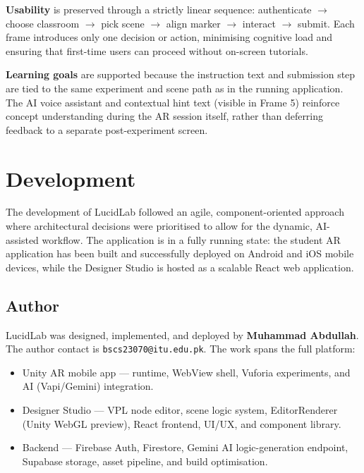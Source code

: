 \documentclass[12pt,a4paper]{article}
\begin{document}
\textbf{Usability} is preserved through a strictly linear sequence: authenticate
$\to$ choose classroom $\to$ pick scene $\to$ align marker $\to$ interact $\to$ submit.
Each frame introduces only one decision or action, minimising cognitive load and ensuring
that first-time users can proceed without on-screen tutorials.

\textbf{Learning goals} are supported because the instruction text and submission step
are tied to the same experiment and scene path as in the running application. The AI
voice assistant and contextual hint text (visible in Frame 5) reinforce concept
understanding during the AR session itself, rather than deferring feedback to a separate
post-experiment screen.

\section{Development}

The development of LucidLab followed an agile, component-oriented approach where
architectural decisions were prioritised to allow for the dynamic, AI-assisted workflow.
The application is in a fully running state: the student AR application has been built
and successfully deployed on Android and iOS mobile devices, while the Designer Studio
is hosted as a scalable React web application.

\subsection{Author}

LucidLab was designed, implemented, and deployed by \textbf{Muhammad Abdullah}.
The author contact is \texttt{bscs23070@itu.edu.pk}. The work spans the full platform:

\begin{itemize}[leftmargin=1.4cm]
  \item Unity AR mobile app --- runtime, WebView shell, Vuforia experiments,
        and AI (Vapi/Gemini) integration.
  \item Designer Studio --- VPL node editor, scene logic system, EditorRenderer
        (Unity WebGL preview), React frontend, UI/UX, and component library.
  \item Backend --- Firebase Auth, Firestore, Gemini AI logic-generation
        endpoint, Supabase storage, asset pipeline, and build optimisation.
\end{itemize}
\end{document}
